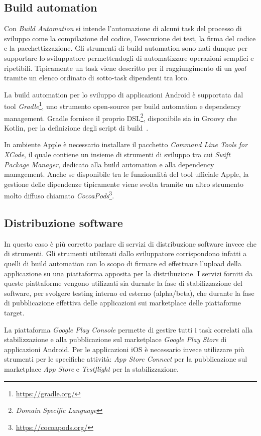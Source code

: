 \subsection*{Build automation}
Con \textit{Build Automation} si intende l'automazione di alcuni task del processo di sviluppo come la compilazione del codice, l'esecuzione dei test, la firma del codice e la pacchettizzazione. Gli strumenti di build automation sono nati dunque per supportare lo sviluppatore permettendogli di automatizzare operazioni semplici e ripetibili. Tipicamente un task viene descritto per il raggiungimento di un \textit{goal} tramite un elenco ordinato di sotto-task dipendenti tra loro.

La build automation per lo sviluppo di applicazioni Android è supportata dal tool \textit{Gradle}\footnote{\href{https://gradle.org/}{https://gradle.org/}}, uno strumento open-source per build automation e dependency management. Gradle fornisce il proprio DSL\footnote{\textit{Domain Specific Language}}, disponibile sia in Groovy che Kotlin, per la definizione degli script di build~\cite{nagy2022simplifying}.

In ambiente Apple è necessario installare il pacchetto \textit{Command Line Tools for XCode}, il quale contiene un insieme di strumenti di sviluppo tra cui \textit{Swift Package Manager}, dedicato alla build automation e alla dependency management. Anche se disponibile tra le funzionalità del tool ufficiale Apple, la gestione delle dipendenze tipicamente viene svolta tramite un altro strumento molto diffuso chiamato \textit{CocoaPods}\footnote{\href{https://cocoapods.org/}{https://cocoapods.org/}}.

\subsection*{Distribuzione software}
In questo caso è più corretto parlare di servizi di distribuzione software invece che di strumenti. Gli strumenti utilizzati dallo sviluppatore corrispondono infatti a quelli di build automation con lo scopo di firmare ed effettuare l'upload della applicazione su una piattaforma apposita per la distribuzione. I servizi forniti da queste piattaforme vengono utilizzati sia durante la fase di stabilizzazione del software, per svolgere testing interno ed esterno (alpha/beta), che durante la fase di pubblicazione effettiva delle applicazioni sui marketplace delle piattaforme target.

La piattaforma \textit{Google Play Console} permette di gestire tutti i task correlati alla stabilizzazione e alla pubblicazione sul marketplace \textit{Google Play Store} di applicazioni Android. Per le applicazioni iOS è necessario invece utilizzare più strumenti per le specifiche attività: \textit{App Store Connect} per la pubblicazione sul marketplace \textit{App Store} e \textit{Testflight} per la stabilizzazione.

